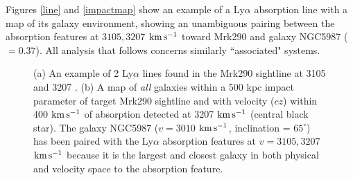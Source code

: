 Figures \ref{line} and \ref{impactmap} show an example of a Ly$\alpha$ absorption line with a map of its galaxy environment, showing an unambiguous pairing between the absorption features at $3105, 3207$ $\rm km\, s^{-1}$ toward Mrk290 and galaxy NGC5987 (\Lstar$ = 0.37$). All analysis that follows concerns similarly ``associated" systems.

\begin{figure}
\centering
  \caption{\small{(a) An example of 2 Ly$\alpha$ lines found in the Mrk290 sightline at 3105 and 3207 . (b) A map of \textit{all} galaxies within a 500 kpc impact parameter of target Mrk290 sightline and with velocity ($cz$) within 400 $\rm km\, s^{-1}$ of absorption detected at 3207 $\rm km\, s^{-1}$ (central black star). The galaxy NGC5987 ($v=3010$ $\rm km\, s^{-1}$, inclination = $65^{\circ}$) has been paired with the Ly$\alpha$ absorption features at $v=3105, 3207$ $\rm km\, s^{-1}$ because it is the largest and closest galaxy in both physical and velocity space to the absorption feature.}}
\vspace{5pt}
\end{figure}

